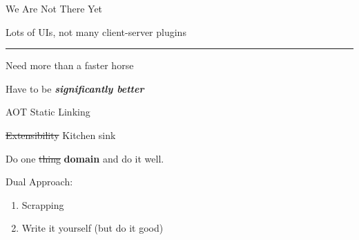 \documentclass{beamer}
\begin{document}
\begin{frame}{We Are Not There Yet}

	Lots of UIs, not many client-server plugins

	\rule{\textwidth}{0.1em}

	Need more than a faster horse

	\hspace{0.1em}

	Have to be \textbf{\textit{significantly better}}

\end{frame}


\begin{frame}{AOT Static Linking}

	\begin{block}{\st{Extensibility} Kitchen sink}

		\vspace{0.5em}

		Do one \st{thing} \textbf{domain} and do it well.

		\vspace{0.5em}

	\end{block}

	\hspace{0.1em}

	Dual Approach:

	\begin{enumerate}

		\item Scrapping

		\item Write it yourself (but do it good)

	\end{enumerate}

\end{frame}
\end{document}
